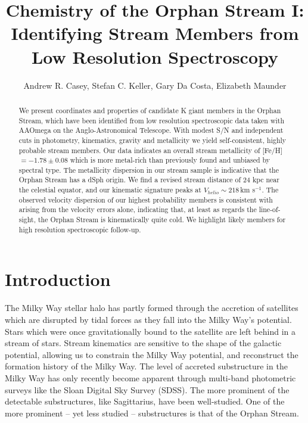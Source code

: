 \documentclass{emulateapj}
\begin{document}
\title{Chemistry of the Orphan Stream I: Identifying Stream Members from Low Resolution Spectroscopy}

\author{Andrew R. Casey, Stefan C. Keller, Gary Da Costa, Elizabeth Maunder}

\begin{abstract}
We present coordinates and properties of candidate K giant members in the Orphan Stream, which have been identified from low resolution spectroscopic data taken with AAOmega on the Anglo-Astronomical Telescope. With modest S/N and independent cuts in photometry, kinematics, gravity and metallicity we yield self-consistent, highly probable stream members. Our data indicates an overall stream metallicity of [Fe/H] $= -1.78 \pm 0.08$ which is more metal-rich than previously found and unbiased by spectral type. The metallicity dispersion in our stream sample is indicative that the Orphan Stream has a dSph origin. We find a revised stream distance of 24 kpc near the celestial equator, and our kinematic signature peaks at $V_{helio} \sim 218$\,km s$^{-1}$. The observed velocity dispersion of our highest probability members is consistent with arising from the velocity errors alone, indicating that, at least as regards the
line-of-sight, the Orphan Stream is kinematically quite cold. We highlight likely members for high resolution spectroscopic follow-up.
\end{abstract}


\section{Introduction}
\label{sec:introduction}

The Milky Way stellar halo has partly formed through the accretion of satellites which are disrupted by tidal forces as they fall into the Milky Way's potential. Stars which were once gravitationally bound to the satellite are left behind in a stream of stars. Stream kinematics are sensitive to the shape of the galactic potential, allowing us to constrain the Milky Way potential, and reconstruct the formation history of the Milky Way. The level of accreted substructure in the Milky Way has only recently become apparent through multi-band photometric surveys like the Sloan Digital Sky Survey (SDSS). The more prominent of the detectable substructures, like Sagittarius, have been well-studied. One of the more prominent \--- yet less studied \--- substructures is that of the Orphan Stream. 
\end{document}
